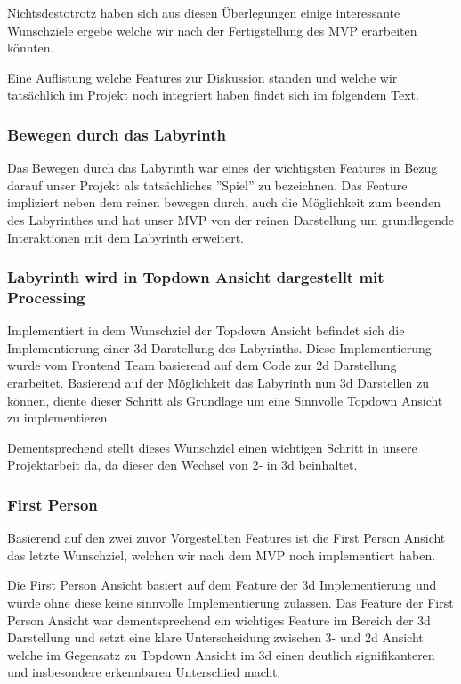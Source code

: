     Nichtsdestotrotz haben sich aus diesen Überlegungen einige interessante Wunschziele ergebe welche wir nach der Fertigstellung des MVP erarbeiten könnten.
    
    Eine Auflistung welche Features zur Diskussion standen und welche wir tatsächlich im Projekt noch integriert haben findet sich im folgendem Text.


    \subsubsection*{Bewegen durch das Labyrinth}
        Das Bewegen durch das Labyrinth war eines der wichtigsten Features in Bezug darauf unser Projekt als tatsächliches ''Spiel'' zu bezeichnen. Das Feature impliziert neben dem reinen bewegen durch, auch die Möglichkeit zum beenden des Labyrinthes und hat unser MVP von der reinen Darstellung um grundlegende Interaktionen mit dem Labyrinth erweitert.
        
    \subsubsection*{Labyrinth wird in Topdown Ansicht dargestellt mit Processing}
    	Implementiert in dem Wunschziel der Topdown Ansicht befindet sich die Implementierung einer 3d Darstellung des Labyrinths. Diese Implementierung wurde vom Frontend Team basierend auf dem Code zur 2d Darstellung erarbeitet. Basierend auf der Möglichkeit das Labyrinth nun 3d Darstellen zu können, diente dieser Schritt als Grundlage um eine Sinnvolle Topdown Ansicht zu implementieren.
    	
    	Dementsprechend stellt dieses Wunschziel einen wichtigen Schritt in unsere Projektarbeit da, da dieser den Wechsel von 2- in 3d beinhaltet.
        
    \subsubsection*{First Person}
        Basierend auf den zwei zuvor Vorgestellten Features ist die First Person Ansicht das letzte Wunschziel, welchen wir nach dem MVP noch implementiert haben. 
        
        Die First Person Ansicht basiert auf dem Feature der 3d Implementierung und würde ohne diese keine sinnvolle Implementierung zulassen. Das Feature der First Person Ansicht war dementsprechend ein wichtiges Feature im Bereich der 3d Darstellung und setzt eine klare Unterscheidung zwischen 3- und 2d Ansicht welche im Gegensatz zu Topdown Ansicht im 3d einen deutlich signifikanteren und insbesondere erkennbaren Unterschied macht.    

